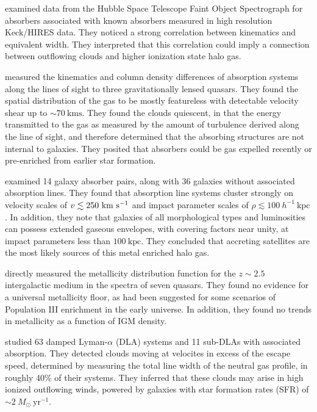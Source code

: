 \documentclass[linenumbers,twocolumn]{aastex61}
\begin{document}
\cite{Churchill1999} examined data from the Hubble Space Telescope Faint Object Spectrograph for {\CIV} absorbers associated with known {\MgII} absorbers measured in high resolution Keck/HIRES data. They noticed a strong correlation between {\MgII} kinematics and {\CIV} equivalent width. They interpreted that this correlation could imply a connection between outflowing {\MgII} clouds and higher ionization state halo gas.

\cite{Rauch2001} measured the kinematics and column density differences of {\CIV} absorption systems along the lines of sight to three gravitationally lensed quasars. They found the spatial distribution of the gas to be mostly featureless with detectable velocity shear up to $\sim70~\mathrm{kms}$. They found the clouds quiescent, in that the energy transmitted to the gas as measured by the amount of turbulence derived along the line of sight, and therefore determined that the absorbing structures are not internal to galaxies. They posited that {\CIV} absorbers could be gas expelled recently or pre-enriched from earlier star formation.

\cite{Chen2001} examined 14 galaxy absorber pairs, along with 36 galaxies without associated {\CIV} absorption lines. They found that {\CIV} absorption line systems cluster strongly on velocity scales of $v \lesssim 250~\mathrm{\hbox{km~s$^{-1}$}}$ and impact parameter scales of $\rho \lesssim 100~h^{-1}~\mathrm{kpc}$. In addition, they note that galaxies of all morphological types and luminosities can possess extended gaseous envelopes, with covering factors near unity, at impact parameters less than $100~\mathrm{kpc}$. They concluded that accreting satellites are the most likely sources of this metal enriched halo gas.

\cite{Simcoe2004} directly measured the metallicity distribution function for the $z \sim 2.5$ intergalactic medium in the spectra of seven quasars. They found no evidence for a universal metallicity floor, as had been suggested for some scenarios of Population III enrichment in the early universe. In addition, they found no trends in metallicity as a function of IGM density.

\cite{Fox2007} studied 63 damped Lyman-$\alpha$ (DLA) systems and 11 sub-DLAs with associated {\CIV} absorption. They detected {\CIV} clouds moving at velocites in excess of the escape speed, determined by measuring the total line width of the neutral gas profile, in roughly 40\% of their systems. They inferred that these clouds may arise in high ionized outflowing winds, powered by galaxies with star formation rates (SFR) of $\sim 2~M_{\odot}~\mathrm{yr^{-1}}$.
\end{document}
